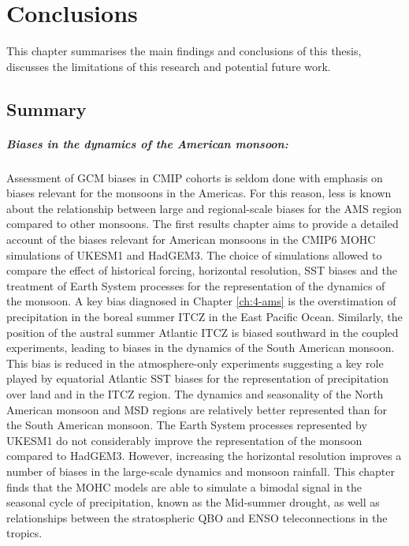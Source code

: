 

\chapter{\label{ch:8-conclusions}Conclusions} 

This chapter summarises the main findings and conclusions of this thesis, discusses the limitations of this research and potential future work.

\section{Summary}

\paragraph{Biases in the dynamics of the American monsoon:}
Assessment of GCM biases in CMIP cohorts is seldom done with emphasis on biases relevant for the monsoons in the Americas. 
For this reason, less is known about the relationship between large and regional-scale biases for the AMS region compared to other monsoons. 
The first results chapter aims to provide a detailed account of the biases relevant for American monsoons in the CMIP6 MOHC simulations of UKESM1 and HadGEM3. 
The choice of simulations allowed to compare the effect of historical forcing, horizontal resolution, SST biases and the treatment of Earth System processes for the representation of the dynamics of the monsoon.
A key bias diagnosed in Chapter \ref{ch:4-ams} is the overstimation of precipitation in the boreal summer ITCZ in the East Pacific Ocean. 
Similarly, the position of the austral summer Atlantic ITCZ is biased southward in the coupled experiments, leading to biases in the dynamics of the South American monsoon. 
This bias is reduced in the atmosphere-only experiments suggesting a key role played by equatorial Atlantic SST biases for the representation of precipitation over land and in the ITCZ region.
The dynamics and seasonality of the North American monsoon and MSD regions are relatively better represented than for the South American monsoon.
The Earth System processes represented by UKESM1 do not considerably improve the representation of the monsoon compared to HadGEM3. 
However, increasing the horizontal resolution improves a number of biases in the large-scale dynamics and monsoon rainfall. 
This chapter finds that the MOHC models are able to simulate a bimodal signal in the seasonal cycle of precipitation, known as the Mid-summer drought, as well as relationships between the stratospheric QBO and ENSO teleconnections in the tropics. 

